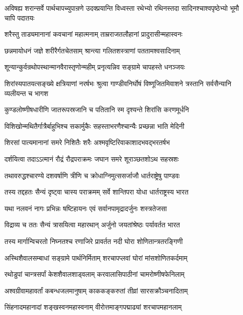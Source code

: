 \threelineshloka
{अविषह्य शरान्सर्वे पार्थचापच्युपान्रणे}
{उदक्प्रयान्ति विध्वस्ता रथेभ्यो रथिनस्तदा}
{सादिनश्चाश्वपृष्ठेभ्यो भूमौ चापि पदातयः}


\twolineshloka
{शरैस्तु ताड्यमानानां कवचानां महात्मनाम्}
{ताम्रराजतलौहानां प्रादुरासीन्महास्वनः}


\twolineshloka
{छन्नमायोधनं जज्ञे शरीरैर्गतचेतसाम्}
{श्रान्त्या गलितशस्त्राणां पततामश्वसादिनाम्}


\twolineshloka
{शून्यान्कुर्वन्रथोपस्थान्मानवैरास्तृणोन्महीम्}
{प्रनृत्यन्निव सङ्ग्रामे चापहस्ते धनञ्जयः}


\threelineshloka
{शिरांस्यपातयत्सङ्ख्ये क्षत्रियाणां नरर्षभः}
{श्रुत्वा गाण्डीवनिर्घोषं विष्णूजितमिवाशने}
{त्रस्तानि सर्वसैन्यानि व्यलीयन्त च भागश}


\twolineshloka
{कुण्डलोष्णीषधारीणि जातरूपस्रजानि च}
{पतितानि स्म दृश्यन्ते शिरांसि करणमूर्धनि}


\twolineshloka
{विशिखोन्मथितैर्गात्रैर्बाहुभिश्च सकार्मुकैः}
{सहस्ताभरणैश्चान्यैः प्रच्छन्ना भाति मेदिनी}


\twolineshloka
{शिरसां पात्यमानानां समरे निशितैः शरैः}
{अश्मवृष्टिरिवाकाशादभवद्भरतर्षभ}


\twolineshloka
{दर्शयित्वा तदाऽऽत्मानं रौद्रं रौद्रपराक्रमः}
{जघान समरे शूराञ्छतशोऽथ सहस्रशः}


\twolineshloka
{तथावरुद्धश्चारण्ये दशवर्षाणि त्रीणि च}
{क्रोधाग्निमुत्ससर्जाजौ धार्तराष्ट्रेषु पाण्डवः}


\twolineshloka
{तस्य तद्दहतः सैन्यं दृष्ट्वा चास्य पराक्रमम्}
{सर्वे शान्तिपरा योधा धार्तराष्ट्रस्य भारत}


\twolineshloka
{यथा नलवनं नागः प्रभिन्नः षष्टिहायनः}
{एवं सर्वानपामृद्रादर्जुनः शस्त्रतेजसा}


\twolineshloka
{विद्राव्य च ततः सैन्यं त्रासयित्वा महारथान्}
{अर्जुनो जयतांश्रेष्ठः पर्यावर्तत भारत}


\twolineshloka
{तस्य मार्गान्विचरतो निघ्नतश्च रणाजिरे}
{प्रावर्तत नदी घोरा शोणितान्त्रतरङ्गिणी}


\twolineshloka
{अस्थिशैवालसम्बाधां सङ्ग्रामे पार्थनिर्मिताम्}
{शरचापप्लवां घोरां मांसशोणितकर्दमाम्}


\twolineshloka
{रथोडुपां चान्त्रसर्पां केशशैवालशाड्वलाम्}
{करवालासिपाठीनां चामरोष्णीषफेनिलाम्}


\twolineshloka
{अश्वग्रीवामहावर्तां कबन्धजलमानुषाम्}
{काककङ्करुतां तीव्रां सारसक्रौञ्चनादिताम्}


\twolineshloka
{सिंहनादमहानादां शङ्खस्वनमहास्वनाम्}
{वीरोत्तमाङ्गपद्माढ्यां शरचापमहानलाम्}


